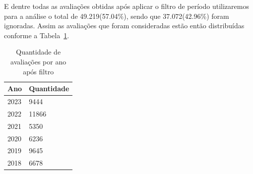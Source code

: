 E dentre todas as avaliações obtidas após aplicar o filtro de período utilizaremos para a análise o total de 49.219(57.04\%), sendo que 37.072(42.96\%) foram ignoradas. Assim as avaliações que foram consideradas estão então distribuídas conforme a Tabela~\ref{table:distribuicao_review_per_year}.

\begin{table}[h]
	\centering
	\begin{tabular}{|l|l|}
		\hline
		\textbf{Ano} & \textbf{Quantidade} \\\hline
		2023         & 9444                \\
		2022         & 11866               \\
		2021         & 5350                \\
		2020         & 6236                \\
		2019         & 9645                \\
		2018         & 6678                \\
		\hline
	\end{tabular}
	\caption{Quantidade de avaliações por ano após filtro}
	\label{table:distribuicao_review_per_year}
\end{table}


